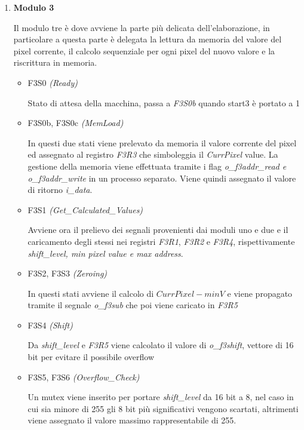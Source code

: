 \documentclass{article}
\begin{document}
\begin{enumerate}
    \item\textbf{Modulo 3} 
		
		Il modulo tre è dove avviene la parte più delicata dell'elaborazione, in particolare a questa parte è delegata la lettura da memoria del valore del pixel corrente, il calcolo sequenziale per ogni pixel del nuovo valore e la riscrittura in memoria.
		
		\begin{itemize}
		
		\item F3S0 \emph{(Ready)}
		
		Stato di attesa della macchina, passa a \emph{F3S0b} quando start3 è portato a 1
		
		\item F3S0b, F3S0c \emph{(MemLoad)}
		
		In questi due stati viene prelevato da memoria il valore corrente del pixel ed assegnato al registro \emph{F3R3} che simboleggia il \emph{CurrPixel} value. La gestione della memoria viene effettuata tramite i flag \emph{o\_f3addr\_read \emph{e} o\_f3addr\_write} in un processo separato. Viene quindi assegnato il valore di ritorno \emph{i\_data}.
		
		\item F3S1 \emph{(Get\_Calculated\_Values)}
		
		Avviene ora il prelievo dei segnali provenienti dai moduli uno e due e il caricamento degli stessi nei registri \emph{F3R1}, \emph{F3R2} e \emph{F3R4}, rispettivamente \textit{shift\_level, min pixel value \emph{e} max address}.
		
		\item F3S2, F3S3 \emph{(Zeroing)}
		
		In questi stati avviene il calcolo di \(CurrPixel - minV\) e viene propagato tramite il segnale \emph{o\_f3sub} che poi viene caricato in \emph{F3R5}
		
		\item F3S4 \emph{(Shift)}
		
		Da \emph{shift\_level} e \emph{F3R5} viene calcolato il valore di \emph{o\_f3shift}, vettore di 16 bit per evitare il possibile overflow
		
		\item F3S5, F3S6 \emph{(Overflow\_Check)}
		
		Un mutex viene inserito per portare \emph{shift\_level} da 16 bit a 8, nel caso in cui sia minore di 255 gli 8 bit più significativi vengono scartati, altrimenti viene assegnato il valore massimo rappresentabile di 255.
		

\end{itemize}
\end{enumerate}
\end{document}
